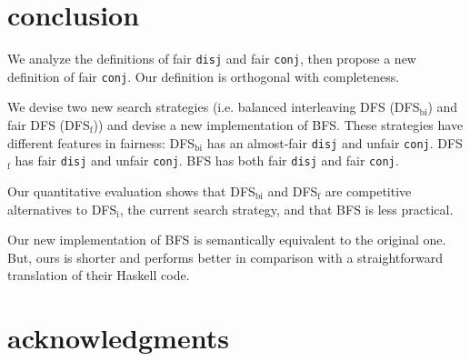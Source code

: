 \documentclass[format=acmlarge, review=true, authordraft=true]{acmart}
\newcommand{\conj}{\texttt{conj}}
\newcommand{\disj}{\texttt{disj}}
\newcommand{\DFSi }[0]{DFS$_\textrm{i}$}
\newcommand{\DFSf }[0]{DFS$_\textrm{f}$}
\newcommand{\DFSbi}[0]{DFS$_\textrm{bi}$}
\newcommand{\BFS}[0]{BFS}
\newcommand{\BFSser}[0]{BFS$_\textrm{ser}$}
\begin{document}
\section{conclusion}

We analyze the definitions of fair \disj{} and fair \conj{}, then propose a 
new definition of fair \conj{}. Our definition is orthogonal with completeness.

We devise two new search strategies (i.e. balanced interleaving DFS 
(\DFSbi{}) and fair DFS (\DFSf{})) and devise a new 
implementation of \BFS. These strategies have different features 
in fairness: \DFSbi{} has an almost-fair \disj{} and unfair \conj{}. 
\DFSf{} has fair \disj{} and unfair \conj{}. \BFS{} has both fair
\disj{} and fair \conj{}.

Our quantitative evaluation shows that \DFSbi{} and \DFSf{} are competitive 
alternatives to \DFSi{}, the current search strategy, 
and that \BFS{} is less practical.

Our new implementation of \BFS{} is semantically equivalent to the original 
one. But, ours is shorter and performs better in comparison with a 
straightforward translation of their Haskell code.



\section*{acknowledgments}



\end{document}
